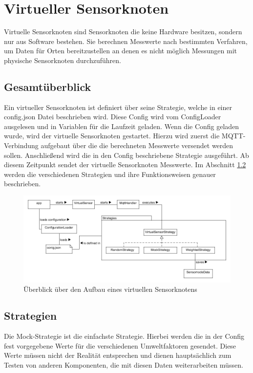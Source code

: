 \section{Virtueller Sensorknoten}
\label{sec:arch:vsk}
Virtuelle Sensorknoten sind Sensorknoten die keine Hardware besitzen, sondern nur aus Software bestehen. Sie berechnen Messwerte nach bestimmten Verfahren, um Daten für Orten bereitzustellen an denen es nicht möglich Messungen mit physische Sensorknoten durchzuführen. 

\subsection{Gesamtüberblick}

Ein virtueller Sensorknoten ist definiert über seine Strategie, welche in einer config.json Datei beschrieben wird. Diese Config wird vom ConfigLoader ausgelesen und in Variablen für die Laufzeit geladen. Wenn die Config geladen wurde, wird der virtuelle Sensorknoten gestartet. Hierzu wird zuerst die MQTT-Verbindung aufgebaut über die die berechneten Messwerte versendet werden sollen. Anschließend wird die in den Config beschriebene Strategie ausgeführt. Ab diesem Zeitpunkt sendet der virtuelle Sensorknoten Messwerte.
Im Abschnitt \ref{strategies} werden die verschiedenen Strategien und ihre Funktionsweisen genauer beschrieben. 

\begin{figure}[H]
	\centering
	\includegraphics[width=1\linewidth]{./ressourcen/VSK-Architektur.png}
	\caption{Überblick über den Aufbau eines virtuellen Sensorknotens}
	\label{img:vsk_architetktur}
\end{figure}

\subsection{Strategien}
\label{strategies}
Die Mock-Strategie ist die einfachste Strategie. Hierbei werden die in der Config fest vorgegebene Werte für die verschiedenen Umweltfaktoren gesendet. Diese Werte müssen nicht der Realität entsprechen und dienen hauptsächlich zum Testen von anderen Komponenten, die mit diesen Daten weiterarbeiten müssen.

